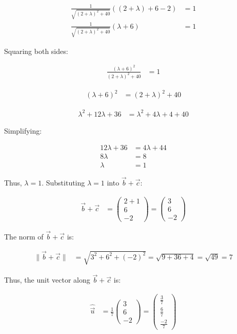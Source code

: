 \documentclass[journal]{IEEEtran}
\numberwithin{figure}{enumi}
\begin{document}
\begin{align}
\frac{1}{\sqrt{(2 + \lambda)^2 + 40}} \left( (2 + \lambda) + 6 - 2 \right) &= 1 \\
\frac{1}{\sqrt{(2 + \lambda)^2 + 40}} ( \lambda + 6) &= 1
\end{align}

Squaring both sides:

\begin{align}
\frac{(\lambda + 6)^2}{(2 + \lambda)^2 + 40} &= 1
\end{align}



\begin{align}
(\lambda + 6)^2 &= (2 + \lambda)^2 + 40
\end{align}


\begin{align}
\lambda^2 + 12\lambda + 36 &= \lambda^2 + 4\lambda + 4 + 40
\end{align}

Simplifying:

\begin{align}
12\lambda + 36 &= 4\lambda + 44 \\
8\lambda &= 8 \\
\lambda &= 1
\end{align}

Thus, $\lambda = 1$. Substituting $\lambda = 1$ into $\vec{b} + \vec{c}$:

\begin{align}
\vec{b} + \vec{c} &= \begin{pmatrix} 2 + 1 \\ 6 \\ -2 \end{pmatrix} = \begin{pmatrix} 3 \\ 6 \\ -2 \end{pmatrix}
\end{align}

The norm of $\vec{b} + \vec{c}$ is:

\begin{align}
\|\vec{b} + \vec{c}\| &= \sqrt{3^2 + 6^2 + (-2)^2} = \sqrt{9 + 36 + 4} = \sqrt{49} = 7
\end{align}

Thus, the unit vector along $\vec{b} + \vec{c}$ is:

\begin{align}
\hat{\vec{u}} &= \frac{1}{7} \begin{pmatrix} 3 \\ 6 \\ -2 \end{pmatrix} = \begin{pmatrix} \frac{3}{7} \\ \frac{6}{7} \\ \frac{-2}{7} \end{pmatrix}
\end{align}
\end{document}
